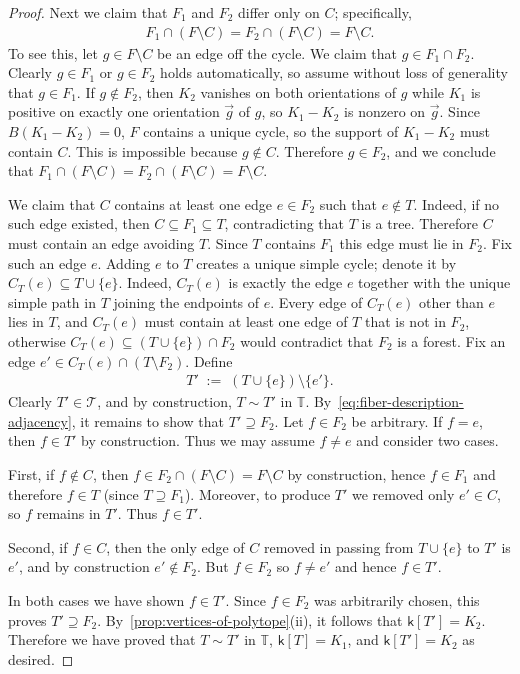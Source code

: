 \documentclass[10pt,a4paper]{amsart}
\newcommand{\setoftrees}{{\mathcal{T}}}
\newcommand{\stategraph}{{\mathbb{T}}}
\newcommand{\embedding}{{\mathsf{k}}}
\begin{document}
\begin{proof}
        Next we claim that $F_1$ and $F_2$ differ only on $C$; specifically,
            \begin{align*}
                F_1\cap(F\setminus C) = F_2\cap(F\setminus C) = F\setminus C.
            \end{align*}
        To see this, let $g\in F\setminus C$ be an edge off the cycle. We claim that $g\in F_1\cap F_2$. Clearly $g\in F_1$ or $g\in F_2$ holds automatically, so assume without loss of generality that $g\in F_1$. If $g\notin F_2$, then $K_2$ vanishes on both orientations of $g$ while $K_1$ is positive on exactly one orientation $\overrightarrow{g}$ of $g$, so $K_1-K_2$ is nonzero on $\overrightarrow{g}$. Since $B(K_1-K_2)=0$, $F$ contains a unique cycle, so the support of $K_1-K_2$ must contain $C$. This is impossible because $g\notin C$. Therefore $g\in F_2$, and we conclude that $F_1\cap(F\setminus C) = F_2\cap(F\setminus C) = F\setminus C$.

        We claim that $C$ contains at least one edge $e\in F_2$ such that $e\notin T$. Indeed, if no such edge existed, then $C\subseteq F_1\subseteq T$, contradicting that $T$ is a tree. Therefore $C$ must contain an edge avoiding $T$. Since $T$ contains $F_1$ this edge must lie in $F_2$. Fix such an edge $e$. Adding $e$ to $T$ creates a unique simple cycle; denote it by $C_T(e)\subseteq T\cup\{e\}$. Indeed, $C_T(e)$ is exactly the edge $e$ together with the unique simple path in $T$ joining the endpoints of $e$. Every edge of $C_T(e)$ other than $e$ lies in $T$, and $C_T(e)$ must contain at least one edge of $T$ that is not in $F_2$, otherwise $C_T(e)\subseteq (T\cup\{e\})\cap F_2$ would contradict that $F_2$ is a forest. Fix an edge $e'\in C_T(e) \cap (T\setminus F_2)$. Define
            \begin{align*}
                T' \;:=\; (T\cup\{e\})\setminus\{e'\}.
            \end{align*}
        Clearly $T'\in\setoftrees$, and by construction, $T\sim T'$ in $\stategraph$. By~\eqref{eq:fiber-description-adjacency}, it remains to show that $T'\supseteq F_2$. Let $f\in F_2$ be arbitrary. If $f=e$, then $f\in T'$ by construction. Thus we may assume $f\neq e$ and consider two cases.
        
        First, if $f\notin C$, then $f\in F_2\cap(F\setminus C)=F\setminus C$ by construction, hence $f\in F_1$ and therefore $f\in T$ (since $T\supseteq F_1$). Moreover, to produce $T'$ we removed only $e'\in C$, so $f$ remains in $T'$. Thus $f\in T'$.
        
        Second, if $f\in C$, then the only edge of $C$ removed in passing from $T\cup\{e\}$ to $T'$ is $e'$, and by construction $e'\notin F_2$. But $f\in F_2$ so $f\neq e'$ and hence $f\in T'$.

        In both cases we have shown $f\in T'$. Since $f\in F_2$ was arbitrarily chosen, this proves $T'\supseteq F_2$. By~\cref{prop:vertices-of-polytope}(ii), it follows that $\embedding[T']=K_2$. Therefore we have proved that $T\sim T'$ in $\stategraph$, $\embedding[T]=K_1$, and $\embedding[T']=K_2$ as desired.
    \end{proof}
\end{document}
